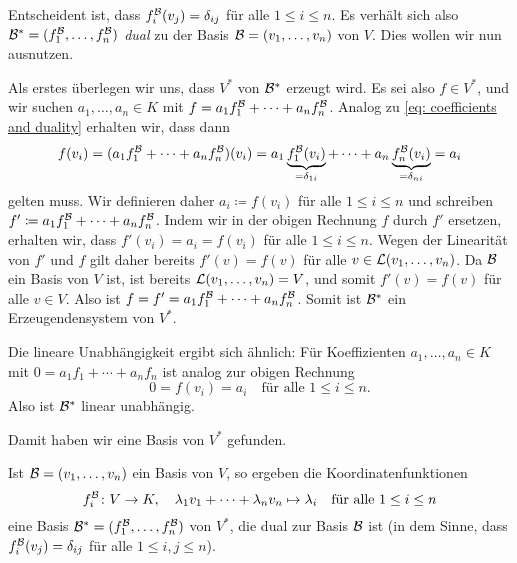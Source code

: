 \documentclass[a4paper,10pt]{article}
\begin{document}
Entscheident ist, dass $f^{\mathcal{B}}_i(v_j) = \delta_{ij}$ für alle $1 \leq i \leq n$. Es verhält sich also $\mathcal{B}^* = (f^{\mathcal{B}}_1, \dotsc, f^{\mathcal{B}}_n)$ \emph{dual} zu der Basis $\mathcal{B} = (v_1, \dotsc, v_n)$ von $V$. Dies wollen wir nun ausnutzen.

Als erstes überlegen wir uns, dass $V^*$ von $\mathcal{B}^*$ erzeugt wird. Es sei also $f \in V^*$, und wir suchen $a_1, \dotsc, a_n \in K$ mit $f = a_1 f^{\mathcal{B}}_1 + \dotsb + a_n f^{\mathcal{B}}_n$. Analog zu \eqref{eq: coefficients and duality} erhalten wir, dass dann
\[
 f(v_i)
 = (a_1 f^{\mathcal{B}}_1 + \dotsb + a_n f^{\mathcal{B}}_n)(v_i)
 = a_1 \underbrace{f^{\mathcal{B}}_1(v_i)}_{=\delta_{1i}} + \dotsb + a_n \underbrace{f^{\mathcal{B}}_n(v_i)}_{=\delta_{ni}}
 = a_i
\]
gelten muss. Wir definieren daher $a_i \coloneqq f(v_i)$ für alle $1 \leq i \leq n$ und schreiben $f' \coloneqq a_1 f^{\mathcal{B}}_1 + \dotsb + a_n f^{\mathcal{B}}_n$. Indem wir in der obigen Rechnung $f$ durch $f'$ ersetzen, erhalten wir, dass $f'(v_i) = a_i = f(v_i)$ für alle $1 \leq i \leq n$. Wegen der Linearität von $f'$ und $f$ gilt daher bereits $f'(v) = f(v)$ für alle $v \in \mathcal{L}(v_1, \dotsc, v_n)$. Da $\mathcal{B}$ ein Basis von $V$ ist, ist bereits $\mathcal{L}(v_1, \dotsc, v_n) = V$, und somit $f'(v) = f(v)$ für alle $v \in V$. Also ist $f = f' = a_1 f^{\mathcal{B}}_1 + \dotsb + a_n f^{\mathcal{B}}_n$. Somit ist $\mathcal{B}^*$ ein Erzeugendensystem von $V^*$.

Die lineare Unabhängigkeit ergibt sich ähnlich: Für Koeffizienten $a_1, \dotsc, a_n \in K$ mit $0 = a_1 f_1 + \dotsb + a_n f_n$ ist analog zur obigen Rechnung
\[
 0 = f(v_i) = a_i
 \quad
 \text{für alle $1 \leq i \leq n$}.
\]
Also ist $\mathcal{B}^*$ linear unabhängig.

Damit haben wir eine Basis von $V^*$ gefunden.

\begin{shaded}
 Ist $\mathcal{B} = (v_1, \dotsc, v_n)$ ein Basis von $V$, so ergeben die Koordinatenfunktionen
 \[
  f^{\mathcal{B}}_i \colon V \to K, \quad \lambda_1 v_1 + \dotsb + \lambda_n v_n \mapsto \lambda_i
  \quad
  \text{für alle $1 \leq i \leq n$}
 \]
 eine Basis $\mathcal{B}^* = (f^{\mathcal{B}}_1, \dotsc, f^{\mathcal{B}}_n)$ von $V^*$, die dual zur Basis $\mathcal{B}$ ist (in dem Sinne, dass $f^{\mathcal{B}}_i(v_j) = \delta_{ij}$ für alle $1 \leq i,j \leq n$).
\end{shaded}
\end{document}
